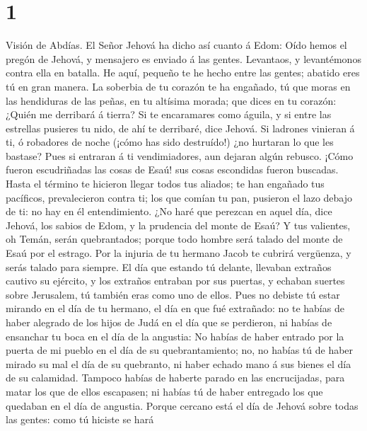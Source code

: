 \hypertarget{section}{%
\section{1}\label{section}}

 Visión de Abdías. El Señor Jehová ha dicho así cuanto á
Edom: Oído hemos el pregón de Jehová, y mensajero es enviado á las
gentes. Levantaos, y levantémonos contra ella en batalla. 
He aquí, pequeño te he hecho entre las gentes; abatido eres tú en gran
manera.  La soberbia de tu corazón te ha engañado, tú que
moras en las hendiduras de las peñas, en tu altísima morada; que dices
en tu corazón: ¿Quién me derribará á tierra?  Si te
encaramares como águila, y si entre las estrellas pusieres tu nido, de
ahí te derribaré, dice Jehová.  Si ladrones vinieran á ti,
ó robadores de noche (¡cómo has sido destruído!) ¿no hurtaran lo que les
bastase? Pues si entraran á ti vendimiadores, aun dejaran algún rebusco.
 ¡Cómo fueron escudriñadas las cosas de Esaú! sus cosas
escondidas fueron buscadas.  Hasta el término te hicieron
llegar todos tus aliados; te han engañado tus pacíficos, prevalecieron
contra ti; los que comían tu pan, pusieron el lazo debajo de ti: no hay
en él entendimiento.  ¿No haré que perezcan en aquel día,
dice Jehová, los sabios de Edom, y la prudencia del monte de Esaú?
 Y tus valientes, oh Temán, serán quebrantados; porque
todo hombre será talado del monte de Esaú por el estrago.
 Por la injuria de tu hermano Jacob te cubrirá vergüenza,
y serás talado para siempre.  El día que estando tú
delante, llevaban extraños cautivo su ejército, y los extraños entraban
por sus puertas, y echaban suertes sobre Jerusalem, tú también eras como
uno de ellos.  Pues no debiste tú estar mirando en el día
de tu hermano, el día en que fué extrañado: no te habías de haber
alegrado de los hijos de Judá en el día que se perdieron, ni habías de
ensanchar tu boca en el día de la angustia:  No habías de
haber entrado por la puerta de mi pueblo en el día de su
quebrantamiento; no, no habías tú de haber mirado su mal el día de su
quebranto, ni haber echado mano á sus bienes el día de su calamidad.
 Tampoco habías de haberte parado en las encrucijadas,
para matar los que de ellos escapasen; ni habías tú de haber entregado
los que quedaban en el día de angustia.  Porque cercano
está el día de Jehová sobre todas las gentes: como tú hiciste se hará
